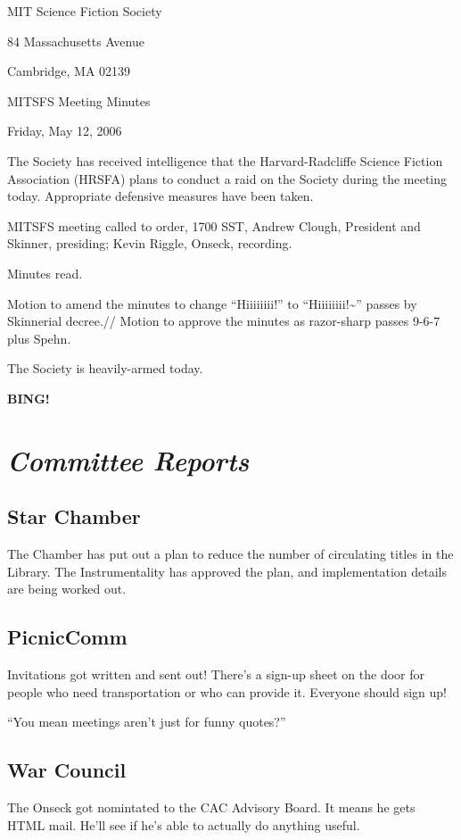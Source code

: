 \documentclass[10pt]{article}
\newcommand{\bing}{{\bf BING!} }
\newcommand{\goto}[1]{\bing \vskip 12pt \section*{{\em{#1}}}}
\newcommand{\ps}{ plus Spehn\xspace}
\begin{document}
\begin{center}

MIT Science Fiction Society

84 Massachusetts Avenue

Cambridge, MA 02139

\vspace{12pt}

MITSFS Meeting Minutes

Friday, May 12, 2006

\end{center}

\vspace{18pt}

\setlength{\parskip}{6pt}

\noindent
The Society has received intelligence that the Harvard-Radcliffe Science Fiction Association 
(HRSFA) plans to conduct a raid on the Society during the meeting today.  Appropriate defensive
measures have been taken.

MITSFS meeting called to order, 1700 SST,
Andrew Clough, President and Skinner, presiding; Kevin Riggle, Onseck, recording.

Minutes read.

Motion to amend the minutes to change ``Hiiiiiiii!'' to ``Hiiiiiiii!\~{}'' passes by Skinnerial decree.//
Motion to approve the minutes as razor-sharp passes 9-6-7\ps.

The Society is heavily-armed today.

\goto{Committee Reports}

\subsection*{Star Chamber}
The Chamber has put out a plan to reduce the number of circulating titles in the Library.  
The Instrumentality has approved the plan, and implementation details are being worked out.

\subsection*{PicnicComm}
Invitations got written and sent out!  There's a sign-up sheet on the door for people who need
transportation or who can provide it.  Everyone should sign up!

``You mean meetings aren't just for funny quotes?''

\subsection*{War Council}
The Onseck got nomintated to the CAC Advisory Board.  It means he gets HTML mail.  He'll see if 
he's able to actually do anything useful.
\end{document}
